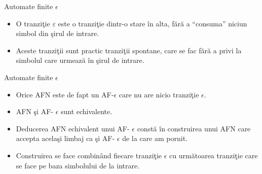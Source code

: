\documentclass[pdf]{beamer}
\begin{document}
\begin{frame}{Automate finite $\epsilon$}
\begin {itemize}
\item
O tranziţie $\varepsilon$ este o tranziţie dintr-o stare în alta,
fără a “consuma” niciun simbol din şirul de intrare.
\item
Aceste tranziţii sunt practic tranziţii spontane, care se fac fără a privi la simbolul care urmează în şirul de intrare.
\end{itemize}

\begin{figure}[H]
\centering
{}
\end{figure}
\end{frame}

\begin{frame}{Automate finite $\epsilon$}
\begin{itemize}
\item
Orice AFN este de fapt un AF-$\epsilon$ care nu are nicio tranziţie $\epsilon$.
\item
AFN şi AF- $\epsilon$ sunt echivalente.
\item
Deducerea AFN echivalent unui AF- $\epsilon$ constă în construirea unui AFN care accepta acelaşi limbaj ca şi AF- $\epsilon$ de la care am pornit.
\item
Construirea se face combinând fiecare tranziţie $\epsilon$ cu următoarea tranziţie care se face pe baza simbolului de la intrare.
\end{itemize}
\end{frame}
\end{document}
